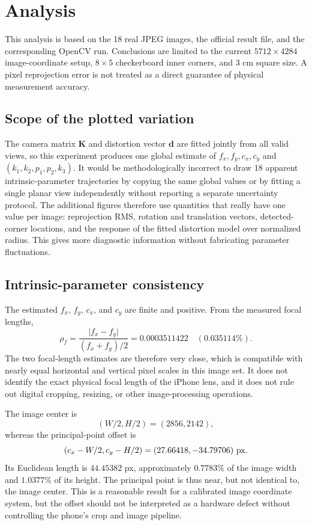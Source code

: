 \section{Analysis}\label{sec:task2-analysis}

This analysis is based on the 18 real JPEG images, the official result file, and the corresponding OpenCV run. Conclusions are limited to the current \(5712\times4284\) image-coordinate setup, \(8\times5\) checkerboard inner corners, and 3 cm square size. A pixel reprojection error is not treated as a direct guarantee of physical measurement accuracy.

\subsection{Scope of the plotted variation}

The camera matrix \(\mathbf K\) and distortion vector \(\mathbf d\) are fitted jointly from all valid views, so this experiment produces one global estimate of \(f_x,f_y,c_x,c_y\) and \((k_1,k_2,p_1,p_2,k_3)\). It would be methodologically incorrect to draw 18 apparent intrinsic-parameter trajectories by copying the same global values or by fitting a single planar view independently without reporting a separate uncertainty protocol. The additional figures therefore use quantities that really have one value per image: reprojection RMS, rotation and translation vectors, detected-corner locations, and the response of the fitted distortion model over normalized radius. This gives more diagnostic information without fabricating parameter fluctuations.

\subsection{Intrinsic-parameter consistency}

The estimated \(f_x\), \(f_y\), \(c_x\), and \(c_y\) are finite and positive. From the measured focal lengths,
\[
\rho_f=\frac{\lvert f_x-f_y\rvert}{(f_x+f_y)/2}
=0.0003511422\quad(0.035114\%).
\]
The two focal-length estimates are therefore very close, which is compatible with nearly equal horizontal and vertical pixel scales in this image set. It does not identify the exact physical focal length of the iPhone lens, and it does not rule out digital cropping, resizing, or other image-processing operations.

The image center is
\[
(W/2,H/2)=(2856,2142),
\]
whereas the principal-point offset is
\[
\left(c_x-W/2,c_y-H/2\right)
=(27.66418,-34.79706)\ {\rm px}.
\]
Its Euclidean length is \(44.45382\) px, approximately \(0.7783\%\) of the image width and \(1.0377\%\) of its height. The principal point is thus near, but not identical to, the image center. This is a reasonable result for a calibrated image coordinate system, but the offset should not be interpreted as a hardware defect without controlling the phone's crop and image pipeline.

